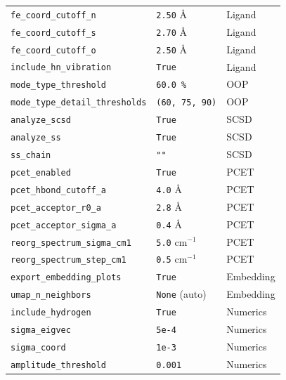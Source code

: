 \documentclass[11pt,a4paper,twoside]{article}
\theoremstyle{remark}
\begin{document}
\begin{longtable}{p{} p{} p{}}
\texttt{fe\_coord\_cutoff\_n}       & \texttt{2.50} \AA    & Ligand \\
\texttt{fe\_coord\_cutoff\_s}       & \texttt{2.70} \AA    & Ligand \\
\texttt{fe\_coord\_cutoff\_o}       & \texttt{2.50} \AA    & Ligand \\
\texttt{include\_hn\_vibration}     & \texttt{True}        & Ligand \\
\midrule
\texttt{mode\_type\_threshold}      & \texttt{60.0\,\%}    & OOP \\
\texttt{mode\_type\_detail\_thresholds} & \texttt{(60, 75, 90)} & OOP \\
\midrule
\texttt{analyze\_scsd}              & \texttt{True}        & SCSD \\
\texttt{analyze\_ss}                & \texttt{True}        & SCSD \\
\texttt{ss\_chain}                  & \texttt{""}          & SCSD \\
\midrule
\texttt{pcet\_enabled}              & \texttt{True}        & PCET \\
\texttt{pcet\_hbond\_cutoff\_a}     & \texttt{4.0} \AA     & PCET \\
\texttt{pcet\_acceptor\_r0\_a}      & \texttt{2.8} \AA     & PCET \\
\texttt{pcet\_acceptor\_sigma\_a}   & \texttt{0.4} \AA     & PCET \\
\texttt{reorg\_spectrum\_sigma\_cm1} & \texttt{5.0} cm$^{-1}$  & PCET \\
\texttt{reorg\_spectrum\_step\_cm1} & \texttt{0.5} cm$^{-1}$  & PCET \\
\midrule
\texttt{export\_embedding\_plots}   & \texttt{True}        & Embedding \\
\texttt{umap\_n\_neighbors}         & \texttt{None} (auto) & Embedding \\
\midrule
\texttt{include\_hydrogen}          & \texttt{True}        & Numerics \\
\texttt{sigma\_eigvec}              & \texttt{5e-4}        & Numerics \\
\texttt{sigma\_coord}               & \texttt{1e-3}        & Numerics \\
\texttt{amplitude\_threshold}       & \texttt{0.001}       & Numerics \\

\end{longtable}
\end{document}

